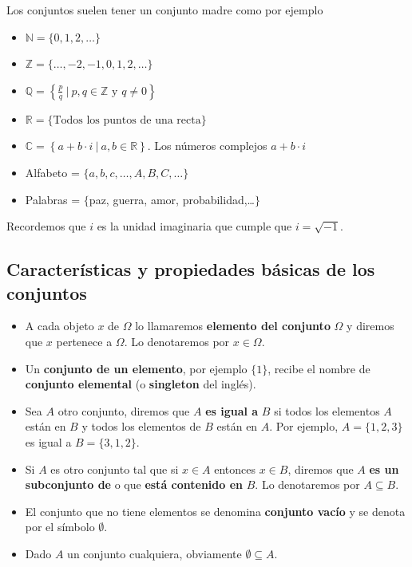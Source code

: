 \documentclass[]{book}
\providecommand{\tightlist}{%
  \setlength{\itemsep}{0pt}\setlength{\parskip}{0pt}}
\begin{document}
Los conjuntos suelen tener un conjunto madre como por ejemplo

\begin{itemize}
\tightlist
\item
  \(\mathbb{N}=\{0,1,2,\ldots\}\)
\item
  \(\mathbb{Z}=\{\ldots,-2,-1,0,1,2,\ldots\}\)
\item
  \(\mathbb{Q}=\left\{\frac{p}{q}\ \Big|\ p,q\in \mathbb{Z} \mbox{ y } q \not= 0\right\}\)
\item
  \(\mathbb{R}=\{\mbox{Todos los puntos de una recta}\}\)
\item
  \(\mathbb{C}= \left\{a+b\cdot i\  \big|\  a,b\in \mathbb{R}\right\}\). Los números complejos \(a+b\cdot i\)
\item
  Alfabeto = \(\{a,b,c,\ldots, A,B,C,\ldots\}\)
\item
  Palabras = \(\{\)paz, guerra, amor, probabilidad,\ldots\(\}\)
\end{itemize}

Recordemos que \(i\) es la unidad imaginaria que cumple que \(i = \sqrt{-1}\).

\hypertarget{caracteruxedsticas-y-propiedades-buxe1sicas-de-los-conjuntos}{%
\subsection{Características y propiedades básicas de los conjuntos}\label{caracteruxedsticas-y-propiedades-buxe1sicas-de-los-conjuntos}}

\begin{itemize}
\tightlist
\item
  A cada objeto \(x\) de \(\Omega\) lo llamaremos \textbf{elemento del conjunto} \(\Omega\) y diremos que \(x\) pertenece a \(\Omega\). Lo denotaremos por \(x\in \Omega\).
\item
  Un \textbf{conjunto de un elemento}, por ejemplo \(\{1\}\), recibe el nombre de \textbf{conjunto elemental} (o \textbf{singleton} del inglés).
\item
  Sea \(A\) otro conjunto, diremos que \(A\) \textbf{es igual a} \(B\) si todos los elementos \(A\) están en \(B\) y todos los elementos de \(B\) están en \(A\). Por ejemplo, \(A=\{1,2,3\}\) es igual a \(B=\{3,1,2\}\).
\item
  Si \(A\) es otro conjunto tal que si \(x\in A\) entonces \(x\in B\), diremos que \(A\) \textbf{es un subconjunto de} o que \textbf{está contenido en} \(B\). Lo denotaremos por \(A\subseteq B.\)
\item
  El conjunto que no tiene elementos se denomina \textbf{conjunto vacío} y se denota por el símbolo \(\emptyset\).
\item
  Dado \(A\) un conjunto cualquiera, obviamente \(\emptyset\subseteq A.\)
\end{itemize}
\end{document}
